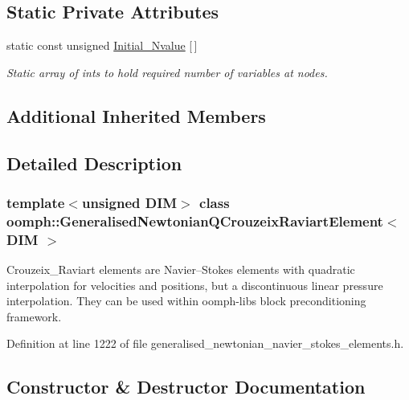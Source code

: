 \subsection*{Static Private Attributes}
\begin{DoxyCompactItemize}
\item 
static const unsigned \hyperlink{classoomph_1_1GeneralisedNewtonianQCrouzeixRaviartElement_ad0f24bc401db33b3ada293b5e58dde55}{Initial\+\_\+\+Nvalue} \mbox{[}$\,$\mbox{]}
\begin{DoxyCompactList}\small\item\em Static array of ints to hold required number of variables at nodes. \end{DoxyCompactList}\end{DoxyCompactItemize}
\subsection*{Additional Inherited Members}


\subsection{Detailed Description}
\subsubsection*{template$<$unsigned D\+IM$>$\newline
class oomph\+::\+Generalised\+Newtonian\+Q\+Crouzeix\+Raviart\+Element$<$ D\+I\+M $>$}

Crouzeix\+\_\+\+Raviart elements are Navier--Stokes elements with quadratic interpolation for velocities and positions, but a discontinuous linear pressure interpolation. They can be used within oomph-\/lib\textquotesingle{}s block preconditioning framework. 

Definition at line 1222 of file generalised\+\_\+newtonian\+\_\+navier\+\_\+stokes\+\_\+elements.\+h.



\subsection{Constructor \& Destructor Documentation}
\mbox{\label{classoomph_1_1GeneralisedNewtonianQCrouzeixRaviartElement_ae8fca2b2f5812bc5651e5c57e73e840e}} 
